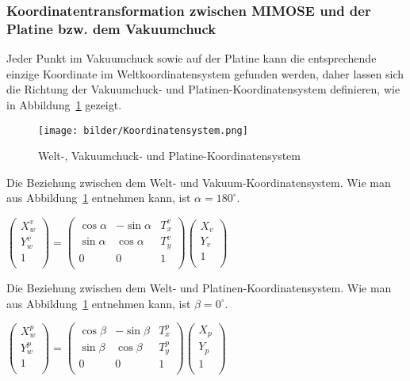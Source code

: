 \subsubsection{Koordinatentransformation zwischen MIMOSE und der Platine bzw. dem Vakuumchuck}

Jeder Punkt im Vakuumchuck sowie auf der Platine kann die entsprechende einzige Koordinate im Weltkoordinatensystem gefunden werden, daher lassen sich die Richtung der Vakuumchuck- und Platinen-Koordinatensystem definieren, wie in Abbildung~\ref{fig:Koordinatensystem} gezeigt.
\begin{figure}[H]
    \centering
    \texttt{[image: bilder/Koordinatensystem.png]}
    \caption{Welt-, Vakuumchuck- und Platine-Koordinatensystem}
    \label{fig:Koordinatensystem}
\end{figure}
Die Beziehung zwischen dem Welt- und Vakuum-Koordinatensystem. Wie man aus Abbildung~\ref{fig:Koordinatensystem} entnehmen kann, ist $\alpha = 180^\circ$.

\begin{center}
$
\begin{pmatrix}
X_w^v \\
Y_w^v \\
1 \\
\end{pmatrix} = 
\begin{pmatrix}
\cos\alpha & -\sin\alpha & T_x^v \\
\sin\alpha & \cos\alpha & T_y^v \\
0 & 0 & 1 \\
\end{pmatrix}
\begin{pmatrix}
X_v \\
Y_v \\
1 \\
\end{pmatrix}
$
\end{center}


Die Beziehung zwischen dem Welt- und Platinen-Koordinatensystem. Wie man aus Abbildung~\ref{fig:Koordinatensystem} entnehmen kann, ist $\beta = 0^\circ$.
\begin{center}
$
\begin{pmatrix}
X_w^p \\
Y_w^p \\
1 \\
\end{pmatrix} = 
\begin{pmatrix}
\cos\beta & -\sin\beta & T_x^p \\
\sin\beta & \cos\beta & T_y^p \\
0 & 0 & 1 \\
\end{pmatrix}
\begin{pmatrix}
X_p \\
Y_p \\
1 \\
\end{pmatrix}
$ 
\end{center}



